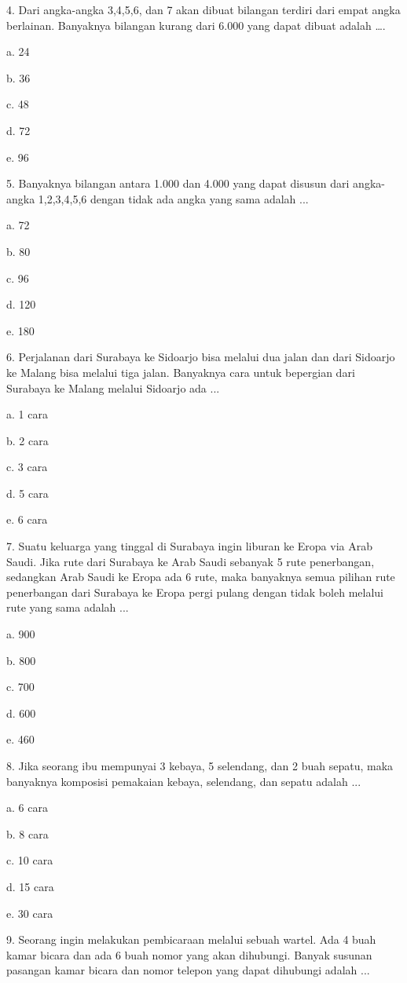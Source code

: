 \documentclass[11pt,fleqn]{book} %
\begin{document}
4. Dari angka-angka 3,4,5,6, dan 7 akan dibuat bilangan terdiri dari empat angka berlainan. Banyaknya bilangan kurang dari 6.000 yang dapat dibuat adalah …. 

a.	24

b.	36

c.	48

d.	72

e.	96


5. Banyaknya bilangan antara 1.000 dan 4.000 yang dapat disusun dari angka-angka 1,2,3,4,5,6 dengan tidak ada angka yang sama adalah ... 

a.	72

b.	80

c.	96

d.	120

e.	180


6. Perjalanan dari Surabaya ke Sidoarjo bisa melalui dua jalan dan dari Sidoarjo ke Malang bisa melalui tiga jalan. Banyaknya cara untuk bepergian dari Surabaya ke Malang melalui Sidoarjo ada ... 

a.	1 cara

b.	2 cara

c.	3 cara

d.	5 cara

e.	6 cara


7. Suatu keluarga yang tinggal di Surabaya ingin liburan ke Eropa via Arab Saudi. Jika rute dari Surabaya ke Arab Saudi sebanyak 5 rute penerbangan, sedangkan Arab Saudi ke Eropa ada 6 rute, maka banyaknya semua pilihan rute penerbangan dari Surabaya ke Eropa pergi pulang dengan tidak boleh melalui rute yang sama adalah ... 

a.	900

b.	800

c.	700

d.	600

e.	460


8. Jika seorang ibu mempunyai 3 kebaya, 5 selendang, dan 2 buah sepatu, maka banyaknya komposisi pemakaian kebaya, selendang, dan sepatu adalah ... 

a.	6 cara

b.	8 cara

c.	10 cara

d.	15 cara

e.	30 cara

9. Seorang ingin melakukan pembicaraan melalui sebuah wartel. Ada 4 buah kamar bicara dan ada 6 buah nomor yang akan dihubungi. Banyak susunan pasangan kamar bicara dan nomor telepon yang dapat dihubungi adalah ... 
\end{document}
